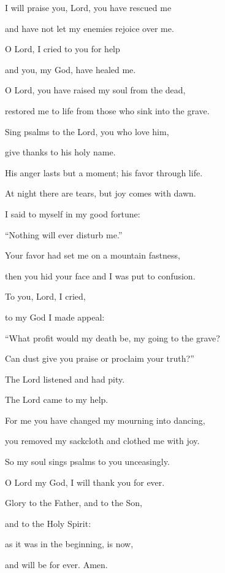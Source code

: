\noindent I will praise you, Lord, you have rescued me~\GreStar{}~\nopagebreak

and have not let my enemies rejoice over me.

\noindent O Lord, I cried to you for help~\GreStar{}~\nopagebreak

and you, my God, have healed me.

\noindent O Lord, you have raised my soul from the dead,~\GreStar{}~\nopagebreak

restored me to life from those who sink into the grave.

\noindent Sing psalms to the Lord, you who love him,~\GreStar{}~\nopagebreak

give thanks to his holy name.

\noindent His anger lasts but a moment; his favor through life.~\GreStar{}~\nopagebreak

At night there are tears, but joy comes with dawn.

\noindent I said to myself in my good fortune:~\GreStar{}~\nopagebreak

“Nothing will ever disturb me.”

\noindent Your favor had set me on a mountain fastness,~\GreStar{}~\nopagebreak

then you hid your face and I was put to confusion.

\noindent To you, Lord, I cried,~\GreStar{}~\nopagebreak

to my God I made appeal:

\noindent ``What profit would my death be, my going to the grave?~\GreStar{}~\nopagebreak

Can dust give you praise or proclaim your truth?”

\noindent The Lord listened and had pity.~\GreStar{}~\nopagebreak

The Lord came to my help.

\noindent For me you have changed my mourning into dancing,~\GreStar{}~\nopagebreak

you removed my sackcloth and clothed me with joy.

\noindent So my soul sings psalms to you unceasingly.~\GreStar{}~\nopagebreak

O Lord my God, I will thank you for ever.

\noindent Glory to the Father, and to the Son,~\GreStar{}~\nopagebreak

and to the Holy Spirit:

\noindent as it was in the beginning, is now,~\GreStar{}~\nopagebreak

and will be for ever. Amen.
